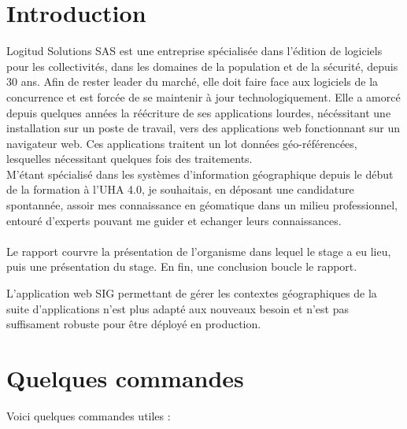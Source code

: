 \documentclass{rapportUHA40}
\begin{document}

\tabledematieres%



\section{Introduction}
Logitud Solutions SAS est une entreprise spécialisée dans l'édition de
logiciels pour les collectivités, dans les domaines de la population et de la
sécurité, depuis 30 ans. Afin de rester leader du marché, elle doit faire face
aux logiciels de la concurrence et est forcée de se maintenir à jour
technologiquement. Elle a amorcé depuis quelques années la réécriture de ses
applications lourdes, nécéssitant une installation sur un poste de travail,
vers des applications web fonctionnant sur un navigateur web. Ces applications
traitent un lot données géo-référencées, lesquelles nécessitant quelques fois
des traitements. \\

M'étant spécialisé dans les systèmes d'information géographique depuis le début
de la formation à l'UHA 4.0, je souhaitais, en déposant une candidature
spontannée, assoir mes connaissance en géomatique dans un milieu professionnel,
entouré d'experts pouvant me guider et echanger leurs connaissances. \\\\

Le rapport courvre la présentation de l'organisme dans lequel le stage a eu
lieu, puis une présentation du stage. En fin, une conclusion boucle le rapport.

L'application web SIG permettant de gérer les contextes géographiques de la
suite d'applications n'est plus adapté aux nouveaux besoin et n'est pas
suffisament robuste pour être déployé en production.


\section{Quelques commandes}

Voici quelques commandes utiles :

\end{document}
